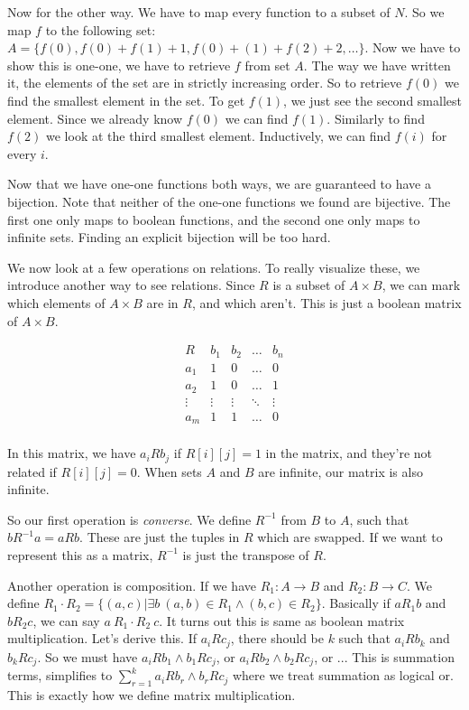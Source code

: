 \documentclass[a4paper,10pt]{article}
\theoremstyle{definition} %
\begin{document}
    Now for the other way. We have to map every function to a subset of $N$. So we map $f$ to the following
    set: \\
    $A =\{f(0), f(0)+f(1)+1, f(0)+(1)+f(2)+2, \dots \}$.
    Now we have to show this is one-one, we have to retrieve $f$ from set $A$. The way we have written it,
    the elements of the set are in strictly increasing order. So to retrieve $f(0)$ we find the smallest 
    element in the set. To get $f(1)$, we just see the second smallest element. Since we already know $f(0)$
    we can find $f(1)$. Similarly to find $f(2)$ we look at the third smallest element. Inductively, we 
    can find $f(i)$ for every $i$.

    Now that we have one-one functions both ways, we are guaranteed to have a bijection. Note that neither
    of the one-one functions we found are bijective. The first one only maps to boolean functions, and the
    second one only maps to infinite sets. Finding an explicit bijection will be too hard.

    We now look at a few operations on relations. To really visualize these, we introduce another way
    to see relations. Since $R$ is a subset of $A \times B$, we can mark which elements of $A \times B$
    are in $R$, and which aren't. This is just a boolean matrix of $A \times B$.

    \[
    \begin{array}{c|cccc}
        R & b_1 & b_2 & \ldots & b_n \\
        \hline
        a_1 & 1 & 0 & \ldots & 0 \\
        a_2 & 1 & 0 & \ldots & 1 \\
        \vdots & \vdots & \vdots & \ddots & \vdots \\
        a_m & 1 & 1 & \ldots & 0 \\
    \end{array}
    \]

    In this matrix, we have $a_i R b_j$ if $R[i][j] = 1$ in the matrix, and they're not 
    related if $R[i][j] = 0$. When sets $A$ and $B$ are infinite, our matrix is also infinite.

    So our first operation is \emph{converse}. We define $R^{-1}$ from $B$ to $A$, such that 
    $b R^{-1} a = a R b$. These are just the tuples in $R$ which are swapped. If we want to represent 
    this as a matrix, $R^{-1}$ is just the transpose of $R$.

    Another operation is composition. If we have $R_1: A \rightarrow B$ and $R_2: B \rightarrow
    C$. We define $R_1 \cdot R_2 = \{(a,c) | \exists b \  (a,b) \in R_1 \land (b,c) \in R_2\}$.
    Basically if $aR_1b$ and $bR_2c$, we can say $a \ R_1 \cdot R_2 \ c$. It turns out this is same 
    as boolean matrix multiplication. Let's derive this. If $a_iRc_j$, there should be $k$ such 
    that $a_iRb_k$ and $b_kRc_j$. So we must have $a_iRb_1 \land b_1Rc_j$, or $a_iRb_2 \land b_2Rc_j$,
    or ... This is summation terms, simplifies to $\sum_{r=1}^{k} a_iRb_r \land b_rRc_j$ where we treat 
    summation as logical or. This is exactly how we define matrix multiplication.
\end{document}
